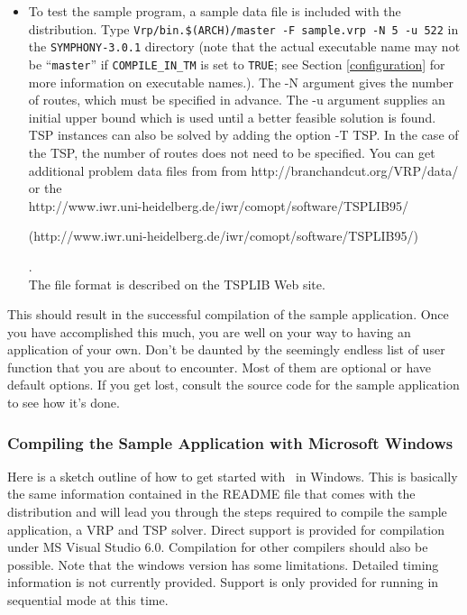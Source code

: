 \begin{itemize}
        \item To test the sample program, a sample data file is included with
the distribution. Type {\tt Vrp/bin.\$(ARCH)/master -F sample.vrp -N 5 -u
522} in the {\tt SYMPHONY-3.0.1} directory (note that the actual executable name may
not be ``{\tt master}'' if {\tt COMPILE\_IN\_TM} is set to {\tt TRUE}; see
Section \ref{configuration} for more information on executable names.). The -N
argument gives the number of routes, which must be specified in advance. The
-u argument supplies an initial upper bound which is used until a better
feasible solution is found. TSP instances can also be solved by adding the
option -T TSP. In the case of the TSP, the number of routes does not need to
be specified. You can get additional problem data files from from
{http://branchandcut.org/VRP/data/} or the \\
{http://www.iwr.uni-heidelberg.de/iwr/comopt/software/TSPLIB95/}
\begin{latexonly}
        (http://www.iwr.uni-heidelberg.de/iwr/comopt/software/TSPLIB95/)
\end{latexonly}. \\
The file
format is described on the TSPLIB Web site.

\end{itemize}

\noindent This should result in the successful compilation of the sample
application. Once you have accomplished this much, you are well on
your way to having an application of your own. Don't be daunted by the
seemingly endless list of user function that you are about to
encounter. Most of them are optional or have default options. If you
get lost, consult the source code for the sample application to see
how it's done.

\subsubsection{Compiling the Sample Application with Microsoft Windows}
\label{getting_strated_windows}

Here is a sketch outline of how to get started with \BB\ in Windows. This is
basically the same information contained in the README file that comes with
the distribution and will lead you through the steps required to compile the
sample application, a VRP and TSP solver. Direct support is provided for
compilation under MS Visual Studio 6.0. Compilation for other compilers should
also be possible. Note that the windows version has some limitations. Detailed
timing information is not currently provided.  Support is only provided for
running in sequential mode at this time.

